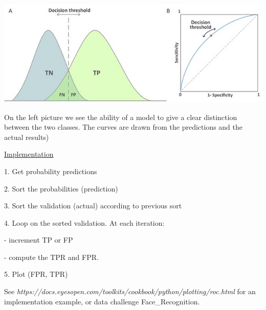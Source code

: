 \vspace{5mm}

\includegraphics[scale=0.5]{../images/overlap_roc.jpeg}

\vspace{5mm}

On the left picture we see the ability of a model to give a clear distinction between the two classes. The curves are drawn from the predictions and the actual results)

\vspace{5mm}

\underline{Implementation}

\vspace{5mm}

1. Get probability predictions

2. Sort the probabilities (prediction)

3. Sort the validation (actual) according to previous sort

4. Loop on the sorted validation. At each iteration:

- increment TP or FP

- compute the TPR and FPR.

5. Plot (FPR, TPR)

\vspace{5mm}

See \textit{https://docs.eyesopen.com/toolkits/cookbook/python/plotting/roc.html} for an implementation example, or data challenge Face\_Recognition.

\vspace{5mm}
